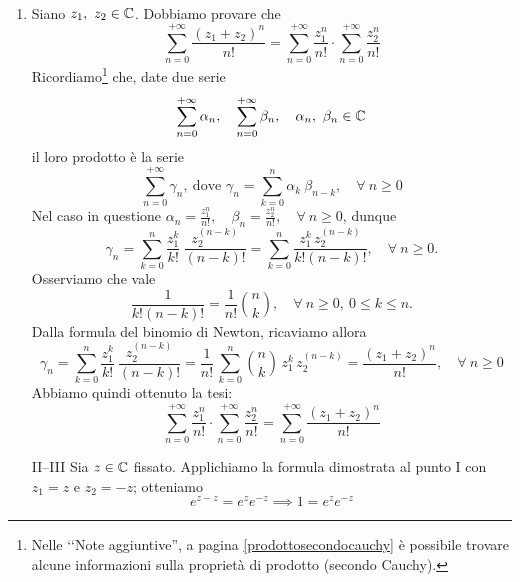 \begin{demonstration}~{}
\begin{enumerate}[label=\Roman*]
\item Siano $z_1,\ z_2\in\mathbb{C}$. Dobbiamo provare che
\begin{equation*}
	\sum_{n=0}^{+\infty} \frac{(z_1+z_2)^n}{n!} =\sum_{n=0}^{+\infty} \frac{z_1^n}{n!} \cdot \sum_{n=0}^{+\infty} \frac{z_2^n}{n!}
\end{equation*}
Ricordiamo\footnote{Nelle ‘‘Note aggiuntive'', a pagina \ref{prodottosecondocauchy} è possibile trovare alcune informazioni sulla proprietà di prodotto (secondo Cauchy).} che, date due serie
\begin{equation*}
	\sum_{n=0}^{+\infty} \alpha_n,\quad \sum_{n=0}^{+\infty} \beta_n,\quad \alpha_n, \ \beta_n \in \mathbb{C}
\end{equation*}
il loro prodotto è la serie
\begin{equation*}
	\sum_{n=0}^{+\infty} \gamma_n,\ \text{dove }\gamma_n= \sum_{k=0}^{n} \alpha_k\ \beta_{n-k},\quad \forall \ n\geq 0
\end{equation*}
Nel caso in questione $\alpha_n=\frac{z_1^n}{n!},\quad \beta_n = \frac{z_2^n}{n!},\quad \forall \ n\geq 0$, dunque
\begin{equation*}
	\gamma_n= \sum_{k=0}^{n} \frac{z_1^k}{k!}\ \frac{z_2^{(n-k)}}{(n-k)!}=\sum_{k=0}^{n} \frac{z_1^k\, z_2^{(n-k)}}{k!(n-k)!},\quad \forall \ n\geq 0.
\end{equation*}
Osserviamo che vale
\begin{equation*}
	\frac{1}{k!(n-k)!}= \frac{1}{n!}\binom{n}{k},\quad \forall \ n\geq 0,\ 0\leq k\leq n.
\end{equation*}
Dalla formula del binomio di Newton, ricaviamo allora
\begin{equation*}
	\gamma_n= \sum_{k=0}^{n} \frac{z_1^k}{k!}\ \frac{z_2^{(n-k)}}{(n-k)!}=\frac{1}{n!}\, \sum_{k=0}^{n} \binom{n}{k}\, z_1^k\, z_2^{(n-k)} =\frac{(z_1+z_2)^n}{n!},\quad \forall \ n\geq 0
\end{equation*}
Abbiamo quindi ottenuto la tesi:
\begin{equation*}
	\sum_{n=0}^{+\infty} \frac{z_1^n}{n!} \cdot \sum_{n=0}^{+\infty} \frac{z_2^n}{n!}= \sum_{n=0}^{+\infty} \frac{(z_1+z_2)^n}{n!}
\end{equation*}
\item[II--III] Sia $z\in\mathbb{C}$ fissato. Applichiamo la formula dimostrata al punto I con $z_1=z$ e $z_2=-z$; otteniamo
\begin{equation*}
	e^{z-z}  = e^{z}e^{-z}\implies 1 = e^{z}e^{-z}

\end{equation*}
\end{enumerate}
\end{demonstration}
